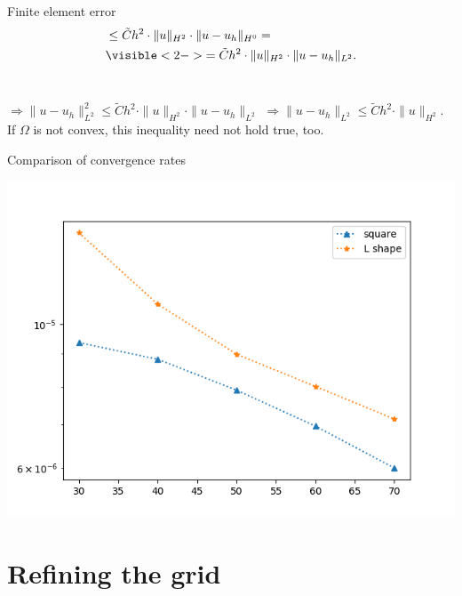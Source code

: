 \documentclass{beamer}
\begin{document}
\begin{frame}{Finite element error}
\begin{align*}
&\leq \tilde{C}h^2\cdot \|u\|_{H^2} \cdot \|u-u_h\|_{H^0} =\\
&\visible<2->{= \tilde{C}h^2\cdot \|u\|_{H^2}\cdot \|u-u_h\|_{L^2}.}
\end{align*}\\

\pause
\pause

\medskip
$\Rightarrow \|u-u_h\|_{L^2}^2 \leq \tilde{C}h^2\cdot \|u\|_{H^2}\cdot \|u-u_h\|_{L^2}$ \pause
$\Rightarrow \|u-u_h\|_{L^2} \leq \tilde{C}h^2 \cdot \|u\|_{H^2}$.\\[2.5ex]

\pause
If $\Omega$ is not convex, this inequality need not hold true, too.\\[0.9cm]
\end{frame}


\begin{frame}{Comparison of convergence rates}

\includegraphics[scale =0.5 \textwidth]{convergence_rate_after_n_steps.png} 
\end{frame}


\section{Refining the grid}
\end{document}
